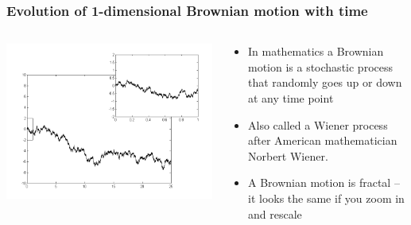 \documentclass{beamer}
\begin{document}
\begin{frame}
  \frametitle{Evolution of 1-dimensional Brownian motion with time}

  \begin{columns}
    \begin{column}{5cm}
      \includegraphics[scale=0.3]{figures/Wiener_process_zoom.png}
    \end{column}
    \begin{column}{5cm}
      \begin{itemize}
      \item In mathematics a Brownian motion is a stochastic process
        that randomly goes up or down at any time point
      \item Also called a Wiener process after American mathematician
        Norbert Wiener.
      \item A Brownian motion is fractal -- it looks the same if you
        zoom in and rescale
      \end{itemize}
    \end{column}
  \end{columns}
  
\end{frame}
\end{document}
